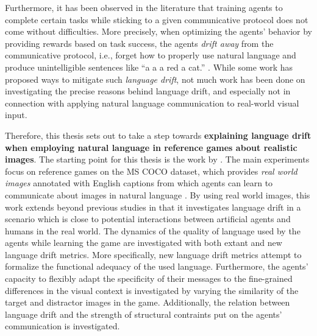 Furthermore, it has been observed in the literature that training agents to complete certain tasks while sticking to a given communicative protocol does not come without difficulties. More precisely, when optimizing the agents' behavior by providing rewards based on task success, the agents \textit{drift away} from the communicative protocol, i.e., forget how to properly use natural language and produce unintelligible sentences like ``a a a red a cat.'' \parencite{lee2019countering, lazaridou2020multi, lu2020countering, lewis2017deal}. While some work has proposed ways to mitigate such \textit{language drift}, not much work has been done on investigating the precise reasons behind language drift, and especially not in connection with applying natural language communication to real-world visual input. 

Therefore, this thesis sets out to take a step towards \textbf{explaining language drift when employing natural language in reference games about realistic images}. The starting point for this thesis is the work by \cite{lazaridou2020multi}. The main  experiments focus on reference games on the MS COCO dataset, which provides \textit{real world images} annotated with English captions from which agents can learn to communicate about images in natural language \parencite{chen2015microsoft}. By using real world images, this work extends beyond previous studies in that it investigates language drift in a scenario which is close to potential interactions between artificial agents and humans in the real world. The dynamics of the quality of language used by the agents while learning the game are investigated with both extant and new language drift metrics. More specifically, new language drift metrics attempt to formalize the functional adequacy of the used language. Furthermore, the agents' capacity to flexibly adapt the specificity of their messages to the fine-grained differences in the visual context is investigated by varying the similarity of the target and distractor images in the game. Additionally, the relation between language drift and the strength of structural contraints put on the agents' communication is investigated.

